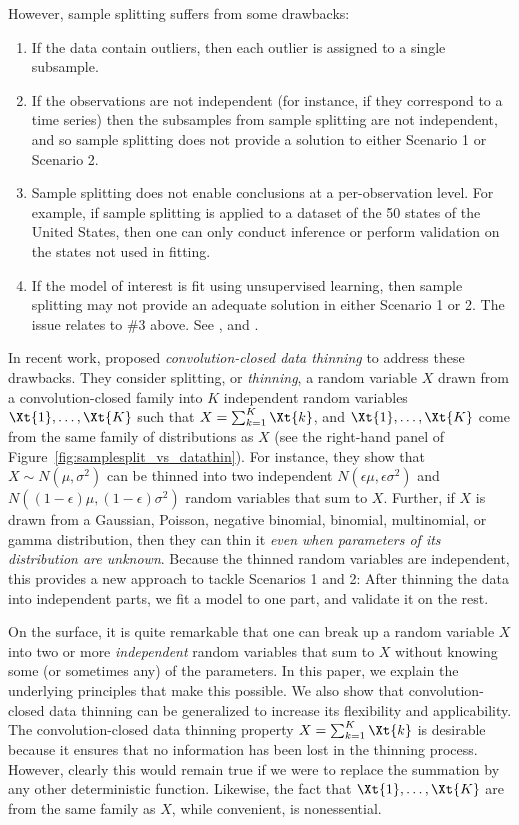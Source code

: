\documentclass[12pt]{article}
\begin{document}
However, sample splitting 
suffers from some drawbacks: 
\begin{enumerate} 
    \item If the data contain outliers, then each outlier is assigned to a single subsample. 
    \item If the observations are not independent (for instance, if they correspond to a time series) then the subsamples from sample splitting are not independent, and so sample splitting does not provide a solution to either Scenario 1 or Scenario 2.
    \item Sample splitting does not enable conclusions at a per-observation level.  
    For example, if sample splitting is applied to a dataset of the 50 states of the United States, then one can only conduct inference or perform validation on the states not used in fitting.
    \item If the model of interest is fit using  unsupervised learning, then  sample splitting may  not provide an adequate solution in either Scenario 1 or 2.  The issue relates to \#3 above. See  \cite{gao2020selective,chen2022selective}, and \cite{neufeld2022inference}. 
\end{enumerate}

In recent work, \cite{neufeld2023data} proposed \emph{convolution-closed data thinning} to address these drawbacks. They consider splitting, or \emph{thinning}, a random variable $X$ drawn from a convolution-closed family into $K$ independent random variables $\Xt{1},\ldots,\Xt{K}$ such that
$X=\sum_{k=1}^K\Xt{k}$, 
and $\Xt{1},\ldots,\Xt{K}$ come from the same family of distributions as $X$ (see the right-hand panel of Figure~\ref{fig:samplesplit_vs_datathin}). 
For instance, they show that $X \sim N(\mu, \sigma^2)$ can be thinned into two independent $N(\epsilon \mu, \epsilon \sigma^2)$ and $N((1-\epsilon) \mu, (1-\epsilon) \sigma^2)$ random variables that sum to $X$. 
Further, if  $X$ is drawn from a Gaussian, Poisson, negative binomial, binomial, multinomial, or gamma distribution, then they can thin it  \emph{even when parameters of its distribution are unknown}. Because the thinned random variables are independent, this
provides a new approach to tackle Scenarios 1 and 2: After thinning the data into independent parts, we fit a model to one part, and validate it on the rest.  




On the surface, it is quite remarkable that one can break up a random variable $X$ into two or more {\em independent} random variables that sum to $X$ without knowing some (or sometimes any) of the parameters.  In this paper, we explain the underlying principles that make this possible. We also show that convolution-closed data thinning can be generalized to increase its flexibility and applicability. The convolution-closed data thinning property $X=\sum_{k=1}^K\Xt{k}$ is desirable because it ensures that no information has been lost in the thinning process. However, clearly this would remain true if we were to replace the summation by any other deterministic function.  Likewise, the fact that $\Xt{1},\ldots,\Xt{K}$ are from the same family as $X$, while convenient, is nonessential. 
\end{document}
